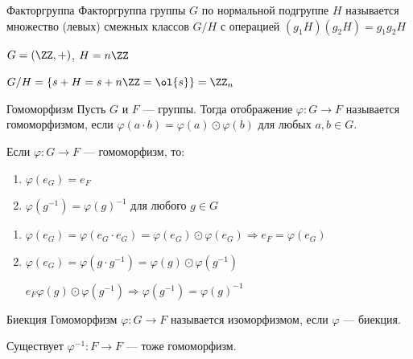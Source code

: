 \begin{defn}{Факторгруппа}{}
    Факторгруппа группы \( G \) по нормальной подгруппе \( H \)
    называется множество (левых) смежных классов \( G / H \) с операцией
    \( (g_1 H) (g_2 H) = g_1 g_2 H \)
\end{defn}

\begin{example}{}{}
    \( G = (\ZZ, +) \), \( H = n \ZZ \)

    \( G / H = \{ s + H = s + n \ZZ = \ol{s} \} = \ZZ_n \)
\end{example}

\begin{defn}{Гомоморфизм}{}
    Пусть \( G \) и \( F \) --- группы.
    Тогда отображение \( \varphi : G \to F \) называется гомоморфизмом,
    если \( \varphi(a \cdot b) = \varphi(a) \odot \varphi(b) \) для любых \( a, b \in G \).
\end{defn}

\begin{lemma}{}{}
    Если \( \varphi : G \to F \) --- гомоморфизм, то:
    \begin{enumerate}
        \item
            \( \varphi(e_G) = e_F \)
        \item
            \( \varphi(g^{-1}) = \varphi(g)^{-1} \) для любого \( g \in G \)
    \end{enumerate}
\end{lemma}

\begin{enumerate}
    \item
        \(
            \varphi(e_G) = \varphi(e_G \cdot e_G) = \varphi(e_G) \odot \varphi(e_G)
            \Rightarrow
            e_F = \varphi(e_G)
        \)
    \item
        \( \varphi(e_G) = \varphi(g \cdot g^{-1}) = \varphi(g) \odot \varphi(g^{-1}) \)

        \( e_F \varphi(g) \odot \varphi(g^{-1}) \Rightarrow \varphi(g^{-1}) = \varphi(g)^{-1} \)
\end{enumerate}

\begin{defn}{Биекция}{}
    Гомоморфизм \( \varphi : G \to F \) называется изоморфизмом,
    если \( \varphi \) --- биекция.
\end{defn}

\begin{exercise}{}{}
    Существует \( \varphi^{-1} : F \to F \) --- тоже гомоморфизм.
\end{exercise}

